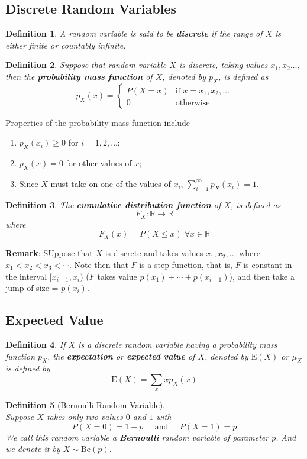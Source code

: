 \documentclass[12pt]{article}
\newcommand{\be}{\mathrm{Be}}
\newcommand{\expec}{\mathrm{E}}
\newtheorem{definition}{Definition}[section]
\theoremstyle{definition}
\begin{document}
\subsection{Discrete Random Variables}
\begin{definition}\normalfont A random variable is said to be \textbf{discrete} if the range of $X$ is either finite or countably infinite.
\end{definition}
\begin{definition}\normalfont Suppose that random variable $X$ is discrete, taking values $x_1,x_2\ldots$, then the \textbf{probability mass function} of $X$, denoted by $p_X$, is defined as
\begin{equation*}
p_X(x)=\begin{cases}
P(X=x)&\text{if }x=x_1,x_2,\ldots\\
0&\text{otherwise}
\end{cases}
\end{equation*}
\end{definition}
Properties of the probability mass function include
\begin{enumerate}
\item $p_X(x_i)\geq 0$ for $i=1,2,\ldots$;
\item $p_X(x)=0$ for other values of $x$;
\item Since $X$ must take on one of the values of $x_i$, $\sum_{i=1}^\infty p_X(x_i)=1$.
\end{enumerate}
\begin{definition}\normalfont The \textbf{cumulative distribution function} of $X$, is defined as
\[
F_X:\mathbb{R}\to\mathbb{R}
\] 
where
\[
F_X(x)=P(X\leq x)\;\forall x\in\mathbb{R}
\]
\end{definition}
\textbf{Remark}: SUppose that $X$ is discrete and takes values $x_1,x_2,\ldots$ where $x_1<x_2<x_3<\cdots$. Note then that $F$ is a step function, that is, $F$ is constant in the interval $[x_{i-1},x_i)$ ($F$ takes value $p(x_1)+\cdots+p(x_{i-1})$), and then take a jump of size = $p(x_i)$.
\subsection{Expected Value}
\begin{definition}\normalfont If $X$ is a discrete random variable having a probability mass function $p_X$, the \textbf{expectation} or \textbf{expected value} of $X$, denoted by $\expec(X)$ or $\mu_X$ is defined by
\[
\expec(X)=\sum_{x}xp_X(x)
\]
\end{definition}
\begin{definition}[Bernoulli Random Variable]
\hfill\\\normalfont Suppose $X$ takes only two values $0$ and $1$ with
\[
P(X=0)=1-p\;\;\;\;\;\text{and}\;\;\;\;\;P(X=1)=p
\]
We call this random variable a \textbf{Bernoulli} random variable of parameter $p$. And we denote it by $X\sim\be(p)$.
\end{definition}
\end{document}
